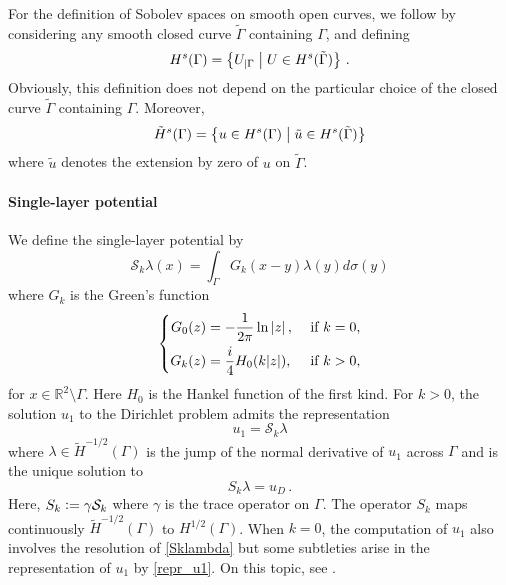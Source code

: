 \documentclass[a4paper]{article}
\begin{document}
For the definition of Sobolev spaces on smooth open curves, we follow
\cite{mclean2000strongly} by considering any smooth closed curve $\tilde{\Gamma}$ containing $\Gamma$, and defining 
\[H^s(\Gamma) = \left\{U_{|\Gamma}\mathrel{}\middle|\mathrel{} U \in H^s(\tilde{\Gamma}) \right\}\,.\]
Obviously, this definition does not depend on the particular choice of the closed curve $\tilde{\Gamma}$ containing $\Gamma$. Moreover,
\[\tilde{H}^s(\Gamma) = \left\{u \in H^s(\Gamma)\mathrel{}\middle|\mathrel{}\tilde{u} \in H^s(\tilde{\Gamma})\right\}\]
where $\tilde{u}$ denotes the extension by zero of $u$ on $\tilde{\Gamma}$.

\paragraph{Single-layer potential}  
We define the single-layer potential by
\begin{equation}
\mathcal{S}_k\lambda(x) = \int_{\Gamma}G_k(x-y)\lambda(y)d\sigma(y)
\label{defSk}
\end{equation}
where $G_k$ is the Green's function
\begin{equation}
\left\{
\begin{aligned}
G_0(z) &= -\dfrac{1}{2\pi} \ln \left\lvert z \right\rvert, && \text{ if } k= 0,\\
G_k(z) &= \frac{i}{4}H_0(k|z|), && \text{ if } k > 0,
\end{aligned} 
\right.
\end{equation} 
for $x\in \mathbb{R}^2\setminus \Gamma$. Here $H_0$ is the Hankel function of the first kind. 
For $k > 0$, the solution $u_1$ to the Dirichlet problem admits the representation
\begin{equation}
u_1 = \mathcal{S}_k \lambda
\label{repr_u1}
\end{equation}
where $\lambda \in \tilde{H}^{-1/2}(\Gamma)$ is the jump of the normal derivative of $u_1$ across $\Gamma$ and is the unique solution to 
\begin{equation}
S_k \lambda = u_D\,.
\label{Sklambda}
\end{equation}
Here, $S_k \mathrel{\mathop:}= \gamma \mathcal{S}_k$ where $\gamma$ is the trace operator on $\Gamma$. The operator $S_k$ maps continuously $\tilde{H}^{-1/2}(\Gamma)$ to $H^{1/2}(\Gamma)$. When $k = 0$, the computation of $u_1$ also involves the resolution of \eqref{Sklambda} but some subtleties arise in the representation of $u_1$ by \eqref{repr_u1}. On this topic, see \cite[Theorem 1.4]{stephan1984augmented}.
\end{document}
